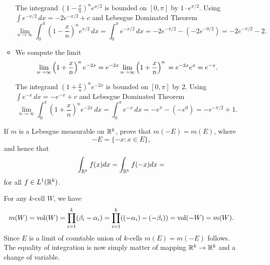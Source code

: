 \begin{enumerate}
\begin{itemize}
The integrand \(\left(1 - \frac{x}{n}\right)^n e^{x/2}\)
is bounded on \([0,\pi]\) by  \(1\cdot e^{\pi/2}\).
Using \(\int e^{-x/2}\,dx = -2e^{-x/2} + c\) and
Lebesgue Dominated Theorem
\begin{equation*}
 \lim_{n\to\infty} \int_0^\pi \left(1 - \frac{x}{n}\right)^n e^{x/2}\, dx =
 \int_0^\pi e^{-x/2}\,dx = -2e^{-\pi/2} - (-2e^{-0/2}) = -2e^{-\pi/2} - 2.
\end{equation*}

\item
We compute the limit
\begin{equation*}
\lim_{n\to\infty} \left(1 + \frac{x}{n}\right)^n e^{-2x}
=  e^{-2x} \lim_{n\to\infty} \left(1 + \frac{x}{n}\right)^n \\
=  e^{-2x} e^x = e^{-x}.
\end{equation*}

The integrand \(\left(1 + \frac{x}{n}\right)^n e^{-2x}\)
is bounded on \([0,\pi]\) by  $2$.
Using \(\int e^{-x}\,dx = -e^{-x} + c\) and
Lebesgue Dominated Theorem
\begin{equation*}
 \lim_{n\to\infty} \int_0^\pi \left(1 + \frac{x}{n}\right)^n e^{-2x}\, dx =
 \int_0^\pi e^{-x}\,dx = -e^{\pi} - (-e^0) = -e^{-\pi/2} + 1.
\end{equation*}

\end{itemize}


\begin{excopy}
If $m$ is a Lebesgue measurable on \(\mathbb{R}^k\), prove that \(m(-E) = m(E)\),
where
\begin{equation*}
 -E  = \{-x: x\in E\},
\end{equation*}
and hence that
\begin{equation*}
 \int_{\mathbb{R}^k} f(x)dx = \int _{\mathbb{R}^k} f(-x)dx =
\end{equation*}
for all \(f\in L^1(\mathbb{R}^k)\).
\end{excopy}

For any $k$-cell $W$, we have
\begin{equation*}
m(W) = \mathop{\rm vol}\nolimits(W) = \prod_{i=1}^k (\beta_i - \alpha_i) =
\prod_{i=1}^k ((-\alpha_i) - (-\beta_i)) = \mathop{\rm vol}\nolimits(-W) = m(W).
\end{equation*}
Since $E$ is a limit of countable union of $k$-cells
\(m(E) = m(-E)\) follows.
The equality of integration is now simply matter of mapping \(\mathbb{R}^k \to \mathbb{R}^k\)
and a change of variable.


\end{enumerate}
